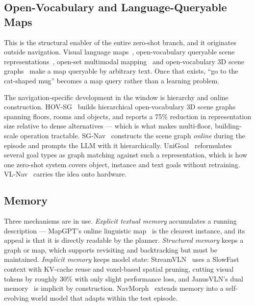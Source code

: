 \documentclass[journal]{IEEEtran}
\begin{document}
\subsection{Open-Vocabulary and Language-Queryable Maps}\label{sec:ovmaps}
This is the structural enabler of the entire zero-shot branch, and it
originates outside navigation. Visual language maps~\cite{huang2023visual}, open-vocabulary queryable
scene representations~\cite{chen2023open}, open-set multimodal
mapping~\cite{jatavallabhula2023conceptfusion} and open-vocabulary 3D scene
graphs~\cite{gu2024conceptgraphs} make a map queryable by arbitrary text.
Once that exists, ``go to the cat-shaped mug'' becomes a map query rather
than a learning problem.

The navigation-specific development in the window is hierarchy and
online construction. HOV-SG~\cite{werby2024hierarchical} builds hierarchical
open-vocabulary 3D scene graphs spanning floors, rooms and objects, and
reports a 75\% reduction in representation size relative to dense
alternatives --- which is what makes multi-floor, building-scale operation
tractable. SG-Nav~\cite{yin2024online} constructs the scene graph
\emph{online} during the episode and prompts the LLM with it hierarchically.
UniGoal~\cite{yin2025unigoal} reformulates several goal types as graph
matching against such a representation, which is how one zero-shot system
covers object, instance and text goals without retraining.
VL-Nav~\cite{du2025neuro} carries the idea onto hardware.

\subsection{Memory}
Three mechanisms are in use. \emph{Explicit textual memory} accumulates a
running description --- MapGPT's online linguistic map~\cite{chen2024mapgpt}
is the clearest instance, and its appeal is that it is directly readable by
the planner. \emph{Structured memory} keeps a graph or map, which supports
revisiting and backtracking but must be maintained.
\emph{Implicit memory} keeps model state: StreamVLN~\cite{wei2025streamvln}
uses a SlowFast context with KV-cache reuse and voxel-based spatial pruning,
cutting visual tokens by roughly 30\% with only slight performance loss,
and JanusVLN's dual memory~\cite{zeng2025janusvln} is implicit by
construction. NavMorph~\cite{yao2025navmorph} extends memory into a
self-evolving world model that adapts within the test episode.

\end{document}
